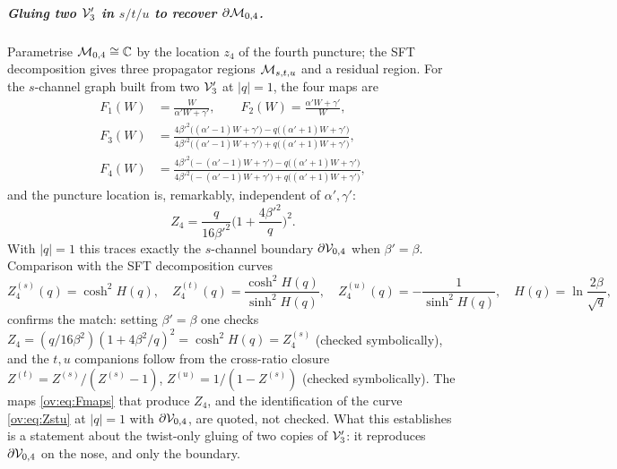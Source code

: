 \subparagraph{Gluing two ${\mathcal{V}}_3'$ in $s/t/u$ to recover $\partial{\mathcal{M}}_{0,4}$.} Parametrise
${\mathcal{M}}_{0,4}\cong\mathbb{C}$ by the location $z_4$ of the fourth puncture; the SFT decomposition gives
three propagator regions ${\mathcal{M}}_{s,t,u}$ and a residual region. For the $s$-channel graph built
from two ${\mathcal{V}}_3'$ at $|q|=1$, the four maps are
\begin{equation}
	\begin{aligned}
		F_1(W)&=\frac{W}{\alpha'W+\gamma'}, \qquad
		F_2(W)=\frac{\alpha'W+\gamma'}{W}, \\
		F_3(W)&=\frac{4\beta'^2\big((\alpha'{-}1)W+\gamma'\big)-q\big((\alpha'{+}1)W+\gamma'\big)}
		{4\beta'^2\big((\alpha'{-}1)W+\gamma'\big)+q\big((\alpha'{+}1)W+\gamma'\big)}, \\
		F_4(W)&=\frac{4\beta'^2\big({-}(\alpha'{-}1)W+\gamma'\big)-q\big((\alpha'{+}1)W+\gamma'\big)}
		{4\beta'^2\big({-}(\alpha'{-}1)W+\gamma'\big)+q\big((\alpha'{+}1)W+\gamma'\big)},
	\end{aligned}
	\label{ov:eq:Fmaps}
\end{equation}
and the puncture location is, remarkably, independent of $\alpha',\gamma'$:
\begin{equation}
	Z_4 = \frac{q}{16\beta'^2}\Big(1+\frac{4\beta'^2}{q}\Big)^2.
	\label{ov:eq:Z4}
\end{equation}
With $|q|=1$ this traces exactly the $s$-channel boundary $\partial{\mathcal{V}}_{0,4}$ when
$\beta'=\beta$. Comparison with the SFT decomposition curves
\begin{equation}
	Z_4^{(s)}(q)=\cosh^2H(q),\quad
	Z_4^{(t)}(q)=\frac{\cosh^2H(q)}{\sinh^2H(q)},\quad
	Z_4^{(u)}(q)=-\frac{1}{\sinh^2H(q)},\quad
	H(q)=\ln\frac{2\beta}{\sqrt q},
	\label{ov:eq:Zstu}
\end{equation}
confirms the match: setting $\beta'=\beta$ one checks
$Z_4=(q/16\beta^2)(1+4\beta^2/q)^2=\cosh^2H(q)=Z_4^{(s)}$ (checked symbolically), and the
$t,u$ companions follow from the cross-ratio closure
$Z^{(t)}=Z^{(s)}/(Z^{(s)}-1)$, $Z^{(u)}=1/(1-Z^{(s)})$ (checked symbolically).
The maps \eqref{ov:eq:Fmaps} that produce $Z_4$, and the identification of the curve \eqref{ov:eq:Zstu} at $|q|=1$ with $\partial{\mathcal{V}}_{0,4}$, are quoted, not checked.
What this establishes is a statement about the twist-only gluing of two copies of ${\mathcal{V}}_3'$: it reproduces $\partial{\mathcal{V}}_{0,4}$ on the nose, and only the boundary.

